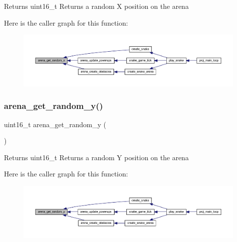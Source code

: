 \begin{DoxyReturn}{Returns}
uint16\+\_\+t Returns a random X position on the arena 
\end{DoxyReturn}
Here is the caller graph for this function\+:\nopagebreak
\begin{figure}[H]
\begin{center}
\leavevmode
\includegraphics[width=350pt]{group__snake_gaf1c909afe83fd09c4650ea8a0413fbf2_icgraph}
\end{center}
\end{figure}
\mbox{\label{group__snake_ga7de9235e557e3ecd489919b5907e53ff}} 
\subsubsection{\texorpdfstring{arena\+\_\+get\+\_\+random\+\_\+y()}{arena\_get\_random\_y()}}
{\footnotesize\ttfamily uint16\+\_\+t arena\+\_\+get\+\_\+random\+\_\+y (\begin{DoxyParamCaption}{ }\end{DoxyParamCaption})}

\begin{DoxyReturn}{Returns}
uint16\+\_\+t Returns a random Y position on the arena 
\end{DoxyReturn}
Here is the caller graph for this function\+:\nopagebreak
\begin{figure}[H]
\begin{center}
\leavevmode
\includegraphics[width=350pt]{group__snake_ga7de9235e557e3ecd489919b5907e53ff_icgraph}
\end{center}
\end{figure}
\mbox{\label{group__snake_ga28f1d377ae0f0b900ce5dbe1ff0f64c3}} 
